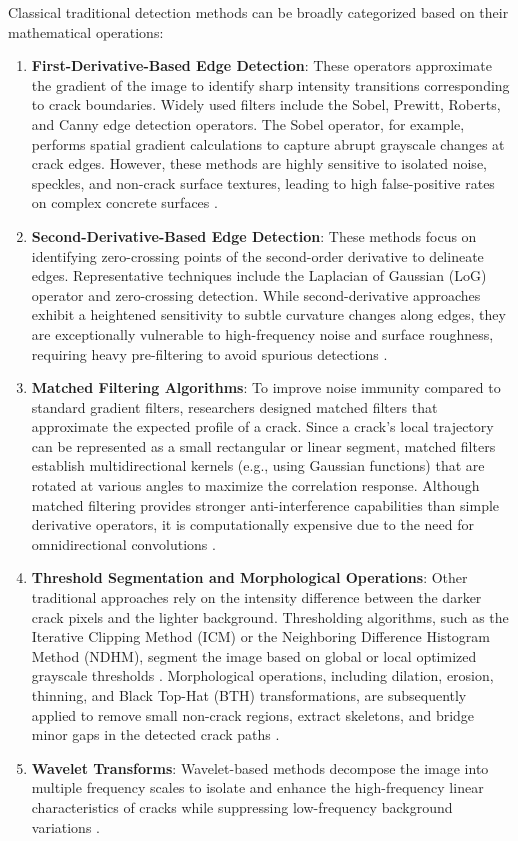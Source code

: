 Classical traditional detection methods can be broadly categorized based on their mathematical operations:
\begin{enumerate}
    \item \textbf{First-Derivative-Based Edge Detection}: These operators approximate the gradient of the image to identify sharp intensity transitions corresponding to crack boundaries. Widely used filters include the Sobel, Prewitt, Roberts, and Canny edge detection operators. The Sobel operator, for example, performs spatial gradient calculations to capture abrupt grayscale changes at crack edges. However, these methods are highly sensitive to isolated noise, speckles, and non-crack surface textures, leading to high false-positive rates on complex concrete surfaces \cite{zhen-liang-2025}.
    \item \textbf{Second-Derivative-Based Edge Detection}: These methods focus on identifying zero-crossing points of the second-order derivative to delineate edges. Representative techniques include the Laplacian of Gaussian (LoG) operator and zero-crossing detection. While second-derivative approaches exhibit a heightened sensitivity to subtle curvature changes along edges, they are exceptionally vulnerable to high-frequency noise and surface roughness, requiring heavy pre-filtering to avoid spurious detections \cite{zhen-liang-2025}.
    \item \textbf{Matched Filtering Algorithms}: To improve noise immunity compared to standard gradient filters, researchers designed matched filters that approximate the expected profile of a crack. Since a crack's local trajectory can be represented as a small rectangular or linear segment, matched filters establish multidirectional kernels (e.g., using Gaussian functions) that are rotated at various angles to maximize the correlation response. Although matched filtering provides stronger anti-interference capabilities than simple derivative operators, it is computationally expensive due to the need for omnidirectional convolutions \cite{zhen-liang-2025}.
    \item \textbf{Threshold Segmentation and Morphological Operations}: Other traditional approaches rely on the intensity difference between the darker crack pixels and the lighter background. Thresholding algorithms, such as the Iterative Clipping Method (ICM) or the Neighboring Difference Histogram Method (NDHM), segment the image based on global or local optimized grayscale thresholds \cite{liu-2019}. Morphological operations, including dilation, erosion, thinning, and Black Top-Hat (BTH) transformations, are subsequently applied to remove small non-crack regions, extract skeletons, and bridge minor gaps in the detected crack paths \cite{zhang-2024a}.
    \item \textbf{Wavelet Transforms}: Wavelet-based methods decompose the image into multiple frequency scales to isolate and enhance the high-frequency linear characteristics of cracks while suppressing low-frequency background variations \cite{zhang-2024a,liu-2019}.
\end{enumerate}

